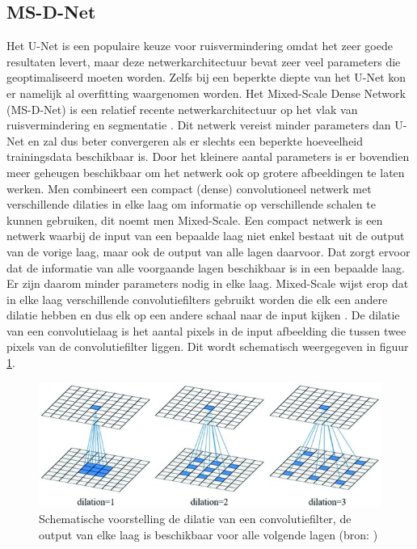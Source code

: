 \documentclass{report}
\begin{document}
\subsection{MS-D-Net}
Het U-Net is een populaire keuze voor ruisvermindering omdat het zeer goede resultaten levert, maar deze netwerkarchitectuur bevat zeer veel parameters die geoptimaliseerd moeten worden. Zelfs bij een beperkte diepte van het U-Net kon er namelijk al overfitting waargenomen worden. Het Mixed-Scale Dense Network (MS-D-Net) is een relatief recente netwerkarchitectuur op het vlak van ruisvermindering en segmentatie \cite{paper:msdnet}. Dit netwerk vereist minder parameters dan U-Net en zal dus beter convergeren als er slechts een beperkte hoeveelheid trainingsdata beschikbaar is. Door het kleinere aantal parameters is er bovendien meer geheugen beschikbaar om het netwerk ook op grotere afbeeldingen te laten werken. Men combineert een compact (dense) convolutioneel netwerk met verschillende dilaties in elke laag om informatie op verschillende schalen te kunnen gebruiken, dit noemt men Mixed-Scale. Een compact netwerk is een netwerk waarbij de input van een bepaalde laag niet enkel bestaat uit de output van de vorige laag, maar ook de output van alle lagen daarvoor. Dat zorgt ervoor dat de informatie van alle voorgaande lagen beschikbaar is in een bepaalde laag. Er zijn daarom minder parameters nodig in elke laag. Mixed-Scale wijst erop dat in elke laag verschillende convolutiefilters gebruikt worden die elk een andere dilatie hebben en dus elk op een andere schaal naar de input kijken \cite{paper:msdnet}. De dilatie van een convolutielaag is het aantal pixels in de input afbeelding die tussen twee pixels van de convolutiefilter liggen. Dit wordt schematisch weergegeven in figuur \ref{fig:tem_dilations}.
\begin{figure}[h!]
	\centering
	\includegraphics[width=12cm]{images/tem/dilations.jpg}
	\caption{Schematische voorstelling de dilatie van een convolutiefilter, de output van elke laag is beschikbaar voor alle volgende lagen (bron: \cite{fig:dilations})}
	\label{fig:tem_dilations}
\end{figure}
\end{document}
